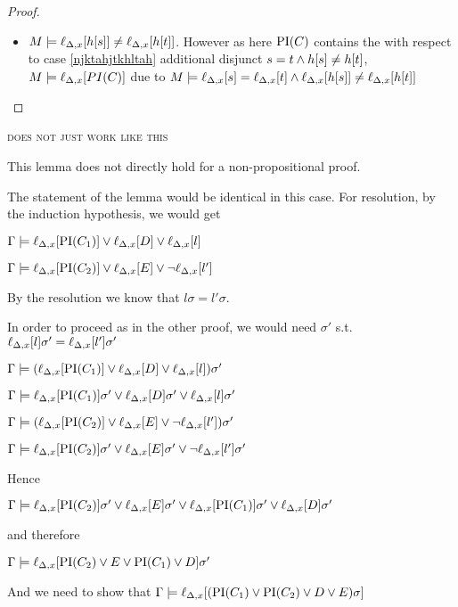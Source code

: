 \begin{proof}
\begin{itemize}
\begin{enumerate}
\begin{itemize}
					\item 
						$M \entails \lif{h\occur{s}} \neq \lif{h\occur{t}}$.
						However as here $\operatorname{PI}(C)$ contains the with respect to case \ref{njktahjtkhltah} additional disjunct $s=t \land h[s] \neq h[t]$,
						$M \entails \lif{PI(C)}$ due to $M \entails \lif{s}=\lif{t} \land \lif{h\occur{s}} \neq \lif{h\occur{t}}$
					\qedhere
					\end{itemize}
			\end{enumerate}

	\end{itemize}

\end{proof}

\begin{remark}

	{\huge

		\textsc{
		does not just work like this
	}

	}

	\newcommand{\lif}[1]{\lift{\Delta}{#1}{x}}
	This lemma does not directly hold for a non-propositional proof.

	The statement of the lemma would be identical in this case. For resolution, by the induction hypothesis, we would get

	$\Gamma \entails \lif{ \PI(C_1)} \lor \lif D  \lor \lif l$

	$\Gamma \entails \lif{ \PI(C_2)} \lor \lif E  \lor \lnot \lif{l'}$

	By the resolution we know that 
	$l\sigma = l'\sigma$.

	In order to proceed as in the other proof, we would need $\sigma'$ s.t.\
	$\lif{l}\sigma' = \lif{l'}\sigma'$

	$\Gamma \entails (\lif{ \PI(C_1)} \lor \lif D  \lor \lif l )\sigma'$

	$\Gamma \entails \lif{ \PI(C_1)}\sigma' \lor \lif D\sigma'  \lor \lif l\sigma'$

	$\Gamma \entails (\lif{ \PI(C_2)} \lor \lif E  \lor \lnot \lif{l'})\sigma'$

	$\Gamma \entails \lif{ \PI(C_2)}\sigma' \lor \lif E\sigma'  \lor \lnot \lif{l'} \sigma'$

	Hence 

	$\Gamma \entails \lif{ \PI(C_2)}\sigma' \lor \lif E\sigma'  \lor
	\lif{ \PI(C_1)}\sigma' \lor \lif D\sigma' $

	and therefore

	$\Gamma \entails \lif{ \PI(C_2) \lor E  \lor
	\PI(C_1) \lor  D}\sigma' $

	And we need to show that 
	$\Gamma \entails \lif{( \PI(C_1) \lor \PI(C_2) \lor D \lor E)\sigma }$



\end{remark}






